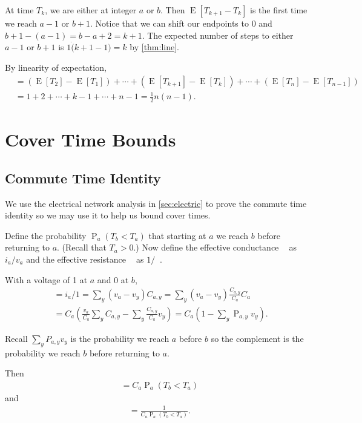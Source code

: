 \documentclass[12pt]{article}
\theoremstyle{definition}
\DeclareMathOperator{\E}{\mathrm{E}}		     %
\DeclareMathOperator{\pr}{\mathrm{P}}		     %
\DeclareMathOperator{\tcov}{t_\textrm{cov}}      %
\DeclareMathOperator{\Ceff}{C_\textrm{eff}}      %
\DeclareMathOperator{\Reff}{R_{\textrm{eff}}}    %
\begin{document}
At time $T_{k}$, we are either at integer $a$ or $b$.
Then $\E[T_{k+1}-T_{k}]$ is the first time we reach $a-1$ or $b+1$.
Notice that we can shift our endpoints to 0 and $b+1-(a-1) = b-a + 2 = k+1$.
The expected number of steps to either $a-1$ or $b+1$
is $1\dot (k+1-1) = k$ by \cref{thm:line}.

By linearity of expectation,
\begin{align}
\tcov &=  (\E[T_2] - \E[T_1]) + \cdots +
(\E[T_{k+1}] - \E[T_{k}]) + \cdots + (\E[T_n] - \E[T_{n-1}]) \nonumber\\
&= 1 + 2 + \cdots + k-1 + \cdots + n-1  = \frac{1}{2}n(n-1). \nonumber
\end{align}

\section{Cover Time Bounds}\label{sec:bounds}

\subsection{Commute Time Identity} \label{sec:commute}
\cite{DS84} We use the electrical network analysis in \cref{sec:electric} to 
prove the commute time identity so we may use it to help us bound
cover times.

Define the probability $\pr_a(T_b < T_a)$ that starting at $a$
we reach $b$ before returning to $a$.
(Recall that $T_a>0$.)
Now define the effective conductance $\Ceff$ as $i_a/v_a$
and the effective resistance $\Reff$ as $1/\Ceff$.

With a voltage of 1 at $a$ and 0 at $b$,
\begin{align}
\Ceff &= i_a/1 =
\sum_y (v_a - v_y) C_{a,y} =
\sum_y (v_a - v_y) \frac{C_{a,y}}{C_a} C_a \nonumber \\
&= C_a (\frac{v_a}{C_a} \sum_y C_{a,y} - \sum_y \frac{C_{a,y}}{C_a} v_y)=
C_a(1-\sum_y\pr_{a,y}v_y).\nonumber
\end{align}

Recall $\sum_y P_{a,y} v_y$ is the probability we reach $a$ before $b$
so the complement is the probability we reach $b$ before returning to $a$.

Then
\begin{align}
\Ceff = C_a \pr_a(T_b < T_a) \nonumber
\end{align}
and
\begin{align}
\Reff = \frac{1}{C_a \pr_a(T_b < T_a)}. \nonumber
\end{align}
\end{document}
